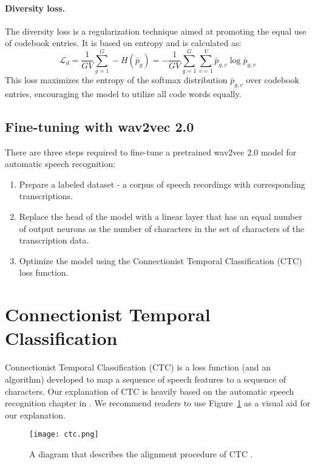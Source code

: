 \paragraph*{Diversity loss.}
The diversity loss is a regularization technique aimed at promoting the equal use of codebook entries. 
It is based on entropy and is calculated as:
\begin{equation}
    \mathcal{L}_d = \dfrac{1}{GV}\sum_{g=1}^{G} -H(\bar{p}_{g}) = -\dfrac{1}{GV}\sum_{g=1}^{G} \sum_{v=1}^{V} \bar{p}_{g,v} \log \bar{p}_{g,v}
\end{equation}
This loss maximizes the entropy of the softmax distribution $\bar{p}_{g,v}$ over codebook entries, encouraging the model to utilize all code words equally.



\subsection{Fine-tuning with wav2vec 2.0}
There are three steps required to fine-tune a pretrained wav2vec 2.0 model for automatic speech recognition:
\begin{enumerate}
    \item Prepare a labeled dataset - a corpus of speech recordings with corresponding transcriptions.
    \item Replace the head of the model with a linear layer that has an equal number of output neurons as the number of
    characters in the set of characters of the transcription data.
    \item Optimize the model using the Connectionist Temporal Classification (CTC) loss function.
\end{enumerate}



\section{Connectionist Temporal Classification}
Connectionist Temporal Classification (CTC) \cite{graves2006connectionist} is a loss function (and an algorithm)
developed to map a sequence of speech features to a sequence of characters.
Our explanation of CTC is heavily based on the automatic speech recognition chapter in \cite{jurafskyspeech}.
We recommend readers to use Figure~\ref{ctc} as a visual aid for our explanation.

\begin{figure}
    \centering
    \captionsetup{justification=centering}
    \texttt{[image: ctc.png]}
    \caption{A diagram that describes the alignment procedure of CTC \cite{jurafskyspeech}.}
    \label{ctc}
\end{figure}

